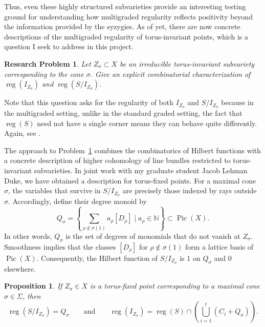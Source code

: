 \documentclass[11pt,reqno]{amsart}
\newtheorem{problem}[lemma]{Research Problem}
\newtheorem{prop}[lemma]{Proposition}
\theoremstyle{remark}
\newcommand{\reg}{\operatorname{reg}}
\newcommand{\Pic}{\operatorname{Pic}}
\newcommand{\NN}{\mathbb{N}}
\begin{document}
 Thus, even these highly structured subvarieties provide an interesting testing ground for understanding how multigraded regularity reflects positivity beyond the information provided by the syzygies. As of yet, there are now concrete descriptions of the multigraded regularity of torus-invariant points, which is a question I seek to address in this project. 

\begin{problem}\label{prob:torus-invariant-mg}
	Let $Z_{\sigma} \subset X$ be an irreducible torus-invariant subvariety corresponding to the cone $\sigma$. Give an explicit combinatorial characterization of $\reg(I_{Z_\sigma})$ and $\reg(S/I_{Z_\sigma})$. 
\end{problem}

Note that this question asks for the regularity of both $I_{Z_\sigma}$ and $S/I_{Z_\sigma}$ because in the multigraded setting, unlike in the standard graded setting, the fact that $\reg(S)$ need not have a single corner means they can behave quite differently. Again, see \cite{bruceHellerSayrafi22}.

The approach to Problem~\ref{prob:torus-invariant-mg} combines the combinatorics of Hilbert functions with a concrete description of higher cohomology of line bundles restricted to torus-invariant subvarieties. In joint work with my graduate student Jacob Lehman Duke, we have obtained a description for torus-fixed points. For a maximal cone $\sigma$, the variables that survive in $S/I_{Z_\sigma}$ are precisely those indexed by rays outside $\sigma$. Accordingly, define their degree monoid by
\[
 Q_\sigma
 =\left\{\sum_{\rho\notin\sigma(1)}a_\rho[D_\rho] \;\big|\;a_\rho\in\NN\right\} \subset\Pic(X).
\]
In other words, $Q_\sigma$ is the set of degrees of monomials that do not vanish at $Z_\sigma$. Smoothness implies that the classes $[D_\rho]$ for $\rho\notin\sigma(1)$ form a lattice basis of $\Pic(X)$. Consequently, the Hilbert function of $S/I_{Z_\sigma}$ is $1$ on $Q_\sigma$ and $0$ elsewhere.

\begin{prop}
	If $Z_{\sigma} \in X$ is a torus-fixed point corresponding to a maximal cone $\sigma \in \Sigma$, then 
	\[
	\reg\left(S/I_{Z_\sigma}\right) = Q_{\sigma} \quad \quad \text{and} \quad \quad  \reg\left(I_{Z_\sigma}\right) = \reg\left(S \right) \cap \left(\bigcup_{i=1}^{t} \left(C_{i}+Q_{\sigma}\right)\right).
	\]
\end{prop}
\end{document}
